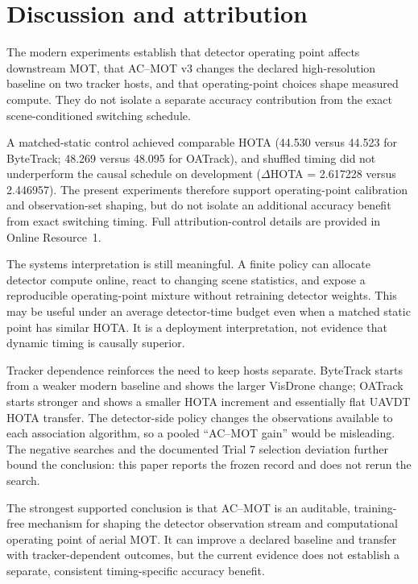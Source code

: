 \section{Discussion and attribution}
The modern experiments establish that detector operating point affects
downstream MOT, that AC--MOT v3 changes the declared high-resolution baseline on
two tracker hosts, and that operating-point choices shape measured compute.
They do not isolate a separate accuracy contribution from the exact
scene-conditioned switching schedule.

A matched-static control achieved comparable HOTA (44.530 versus 44.523 for
ByteTrack; 48.269 versus 48.095 for OATrack), and shuffled timing did not
underperform the causal schedule on development ($\Delta$HOTA = 2.617228 versus
2.446957). The present experiments therefore support operating-point
calibration and observation-set shaping, but do not isolate an additional
accuracy benefit from exact switching timing. Full attribution-control details
are provided in Online Resource~1.

The systems interpretation is still meaningful. A finite policy can allocate
detector compute online, react to changing scene statistics, and expose a
reproducible operating-point mixture without retraining detector weights. This
may be useful under an average detector-time budget even when a matched static
point has similar HOTA. It is a deployment interpretation, not evidence that
dynamic timing is causally superior.

Tracker dependence reinforces the need to keep hosts separate. ByteTrack starts
from a weaker modern baseline and shows the larger VisDrone change; OATrack
starts stronger and shows a smaller HOTA increment and essentially flat UAVDT
HOTA transfer. The detector-side policy changes the observations available to
each association algorithm, so a pooled ``AC--MOT gain'' would be misleading.
The negative searches and the documented Trial 7 selection deviation further
bound the conclusion: this paper reports the frozen record and does not rerun
the search.

The strongest supported conclusion is that AC--MOT is an auditable,
training-free mechanism for shaping the detector observation stream and
computational operating point of aerial MOT. It can improve a declared
baseline and transfer with tracker-dependent outcomes, but the current evidence
does not establish a separate, consistent timing-specific accuracy benefit.

